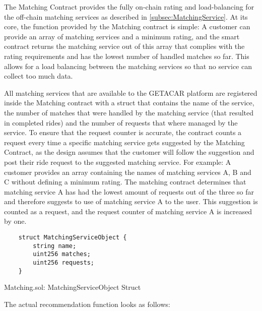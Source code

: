 The Matching Contract provides the fully on-chain rating and load-balancing for the off-chain matching services as described in \ref{subsec:MatchingService}. At its core, the function provided by the Matching contract is simple: A customer can provide an array of matching services and a minimum rating, and the smart contract returns the matching service out of this array that complies with the rating requirements and has the lowest number of handled matches so far. This allows for a load balancing between the matching services so that no service can collect too much data.

All matching services that are available to the GETACAR platform are registered inside the Matching contract with a struct that contains the name of the service, the number of matches that were handled by the matching service (that resulted in completed rides) and the number of requests that where managed by the service. To ensure that the request counter is accurate, the contract counts a request every time a specific matching service gets suggested by the Matching Contract, as the design assumes that the customer will follow the suggestion and post their ride request to the suggested matching service. For example: A customer provides an array containing the names of matching services A, B and C without defining a minimum rating. The matching contract determines that matching service A has had the lowest amount of requests out of the three so far and therefore suggests to use of matching service A to the user. This suggestion is counted as a request, and the request counter of matching service A is increased by one.

\lstset{
  basicstyle=\footnotesize\ttfamily,
  breaklines=true,
  numbers=left,
  firstnumber=6
}

\begin{Listing}
\begin{lstlisting}
    struct MatchingServiceObject {
        string name;
        uint256 matches;
        uint256 requests;
    }
\end{lstlisting}
  \caption{Matching.sol: MatchingServiceObject Struct}
  \label{lst:MatchingServiceObject}
\end{Listing}


The actual recommendation function looks as follows: 

\lstset{
  basicstyle=\footnotesize\ttfamily,
  breaklines=true,
  numbers=left,
  firstnumber=59
}

